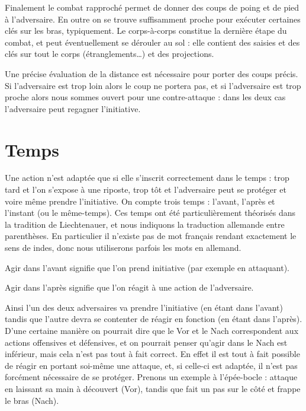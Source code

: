 Finalement le combat rapproché permet de donner des coups de poing et de pied à l'adversaire.
En outre on se trouve suffisamment proche pour exécuter certaines clés sur les bras, typiquement.
Le corps-à-corps constitue la dernière étape du combat, et peut éventuellement se dérouler au sol : elle contient des saisies et des clés sur tout le corps (étranglements…) et des projections.

Une précise évaluation de la distance est nécessaire pour porter des coups précis.
Si l'adversaire est trop loin alors le coup ne portera pas, et si l'adversaire est trop proche alors nous sommes ouvert pour une contre-attaque : dans les deux cas l'adversaire peut regagner l'initiative.


\section{Temps}



Une action n'est adaptée que si elle s'inscrit correctement dans le temps : trop tard et l'on s'expose à une riposte, trop tôt et l'adversaire peut se protéger et voire même prendre l'initiative.
On compte trois temps : l'avant, l'après et l'instant (ou le même-temps).
Ces temps ont été particulièrement théorisés dans la tradition de Liechtenauer, et nous indiquons la traduction allemande entre parenthèses.
En particulier il n'existe pas de mot français rendant exactement le sens de indes, donc nous utiliserons parfois les mots en allemand.


\begin{definition}

Agir dans l'avant signifie que l'on prend initiative (par exemple en attaquant).
\end{definition}


\begin{definition}

Agir dans l'après signifie que l'on réagit à une action de l'adversaire.
\end{definition}


Ainsi l'un des deux adversaires va prendre l'initiative (en étant dans l'avant) tandis que l'autre devra se contenter de réagir en fonction (en étant dans l'après).
D'une certaine manière on pourrait dire que le Vor et le Nach correspondent aux actions offensives et défensives, et on pourrait penser qu'agir dans le Nach est inférieur, mais cela n'est pas tout à fait correct.
En effet il est tout à fait possible de réagir en portant soi-même une attaque, et, si celle-ci est adaptée, il n'est pas forcément nécessaire de se protéger.
Prenons un exemple à l'épée-bocle : \A attaque en laissant sa main à découvert (Vor), tandis que \D fait un pas sur le côté et frappe le bras (Nach).


